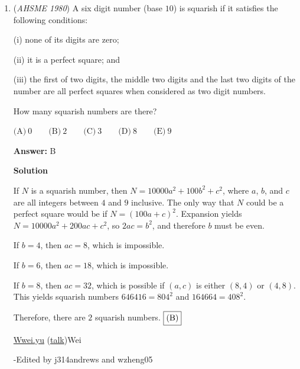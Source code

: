 \begin{enumerate}
 -j314andrews

 


	\item (\textit{AHSME 1980}) A six digit number (base $10$) is squarish if it satisfies the following conditions: 


 (i) none of its digits are zero; 


 (ii) it is a perfect square; and 


 (iii) the first of two digits, the middle two digits and the last two digits of the number are all perfect squares when considered as two digit numbers. 


 How many squarish numbers are there? 


 $\text{(A)} \ 0 \qquad  \text{(B)} \ 2 \qquad  \text{(C)} \ 3 \qquad  \text{(D)} \ 8 \qquad  \text{(E)} \ 9$

 \textbf{Answer: }B



\textbf{Solution}

If $N$ is a squarish number, then $N = 10000a^2 + 100b^2+ c^2$, where $a$, $b$, and $c$ are all integers between $4$ and $9$ inclusive.  The only way that $N$ could be a perfect square would be if $N = (100a + c)^2$.  Expansion yields $N = 10000a^2 + 200ac + c^2$, so $2ac = b^2$, and therefore $b$ must be even.

 If $b = 4$, then $ac = 8$, which is impossible.

 If $b = 6$, then $ac = 18$, which is impossible.

 If $b = 8$, then $ac = 32$, which is possible if $(a,c)$ is either $(8,4)$ or $(4,8)$.  This yields squarish numbers $646416 = 804^2$ and $164664 = 408^2$.

 Therefore, there are $2$ squarish numbers. $\fbox{(B)}$ 

 \href{https://artofproblemsolving.com/wiki/index.php?title=User:Wwei.yu&action=edit&redlink=1}{Wwei.yu} (\href{https://artofproblemsolving.com/wiki/index.php?title=User\_talk:Wwei.yu&action=edit&redlink=1}{talk})Wei

 -Edited by j314andrews and wzheng05

 


\end{enumerate}